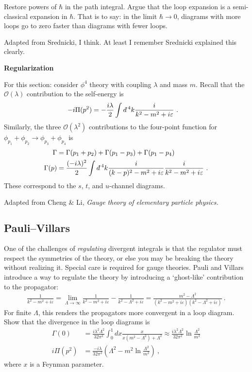 \documentclass[12pt]{article}
\numberwithin{equation}{subsection}    %
\newcommand{\dbar}{d\mkern-6mu\mathchar'26}    %
\begin{document}
Restore powers of $\hbar$ in the path integral. Argue that the loop expansion is a semi-classical expansion in $\hbar$. That is to say: in the limit $\hbar\to 0$, diagrams with more loops go to zero faster than diagrams with fewer loops.


{\footnotesize Adapted from Srednicki, I think. At least I remember Srednicki explained this clearly.}




\vspace{1em}
{\Large \bf \sffamily Regularization}

For this section: consider $\phi^4$ theory with coupling $\lambda$ and mass $m$. Recall that the $\mathcal O(\lambda)$ contribution to the self-energy is
\begin{align}
	-i\Pi(p^2)
	&=
	-\frac{i\lambda}{2}
	\int \dbar^4 k
	\frac{i}{k^2 - m^2 + i\varepsilon} \ .
\end{align}
Similarly, the three $\mathcal O(\lambda^2)$ contributions to the four-point function for $\phi_{p_1} + \phi_{p_2} \to \phi_{p_3} + \phi_{p_4}$ is
\begin{align}
	\Gamma &= \Gamma(p_1+p_2) + \Gamma(p_1-p_3) + \Gamma (p_1-p_4)
	\\
	\Gamma(p) 
	&= \frac{(-i\lambda)^2}{2}
	\int \dbar^4 k
	\frac{i}{(k-p)^2 - m^2 + i\varepsilon}
	\frac{i}{k^2 - m^2 + i\varepsilon}
	\ .
\end{align}
These correspond to the $s$, $t$, and $u$-channel diagrams.


{\footnotesize Adapted from Cheng \& Li, \emph{Gauge theory of elementary particle physics.}}

\subsection{Pauli--Villars}

One of the challenges of \emph{regulating} divergent integrals is that the regulator must respect the symmetries of the theory, or else you may be breaking the theory without realizing it. Special care is required for gauge theories. Pauli and Villars introduce a way to regulate the theory by introducing a `ghost-like' contribution to the propagator:
\begin{align}
	\frac{1}{k^2 - m^2 + i \varepsilon}
	=
	\lim_{\Lambda\to\infty}
	\frac{1}{k^2 - m^2 + i \varepsilon}
	-
	\frac{1}{k^2 - \Lambda^2 + i \varepsilon}
	=
	\frac{m^2 - \Lambda^2}{\left(k^2 - m^2 + i \varepsilon\right)\left(k^2 - \Lambda^2 + i \varepsilon\right)}
	\ .
\end{align}
For finite $\Lambda$, this renders the propagators more convergent in a loop diagram. Show that the divergence in the loop diagrams is
\begin{align}
	\Gamma(0)
	&=
	\frac{i\lambda^2\Lambda^2}{32\pi^2}
	\int_0^1
	dx
	\frac{x}{x(m^2-\Lambda^2) + \Lambda^2} \approx 
	\frac{i\lambda^2\Lambda^2}{32\pi^2}
	\ln \frac{\Lambda^2}{m^2} 
	\\
	i\Pi(p^2) &= 
	\frac{-i\lambda}{32\pi^2}\left(\Lambda^2 - m^2 \ln \frac{\Lambda^2}{m^2}\right) %
	\ ,
\end{align}
where $x$ is a Feynman parameter.
\end{document}
